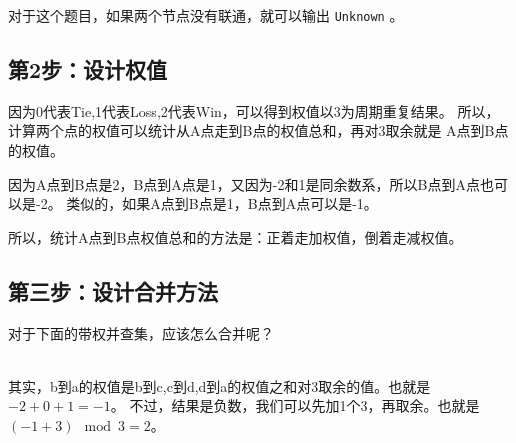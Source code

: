 \documentclass{note}
\begin{document}
对于这个题目，如果两个节点没有联通，就可以输出 \verb|Unknown| 。

\subsection{第2步：设计权值}
因为0代表Tie,1代表Loss,2代表Win，可以得到权值以3为周期重复结果。
所以，计算两个点的权值可以统计从A点走到B点的权值总和，再对3取余就是
A点到B点的权值。

因为A点到B点是2，B点到A点是1，又因为-2和1是同余数系，所以B点到A点也可以是-2。
类似的，如果A点到B点是1，B点到A点可以是-1。

所以，统计A点到B点权值总和的方法是：正着走加权值，倒着走减权值。

\subsection{第三步：设计合并方法}
对于下面的带权并查集，应该怎么合并呢？\\
\\
\par
其实，b到a的权值是b到c,c到d,d到a的权值之和对3取余的值。也就是\\
$ -2 + 0 + 1 = -1 $。
不过，结果是负数，我们可以先加1个3，再取余。也就是 $ (-1 + 3) \mod 3 = 2 $。
\end{document}
